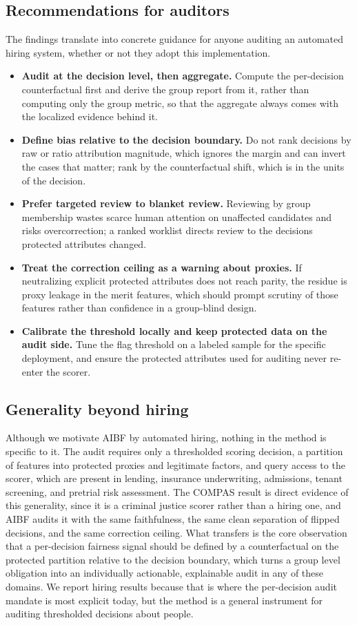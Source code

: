 \documentclass[conference]{IEEEtran}
\begin{document}
\subsection{Recommendations for auditors}
The findings translate into concrete guidance for anyone auditing an automated hiring
system, whether or not they adopt this implementation.

\begin{itemize}
\item \textbf{Audit at the decision level, then aggregate.} Compute the per-decision
counterfactual first and derive the group report from it, rather than computing only the
group metric, so that the aggregate always comes with the localized evidence behind it.
\item \textbf{Define bias relative to the decision boundary.} Do not rank decisions by
raw or ratio attribution magnitude, which ignores the margin and can invert the cases
that matter; rank by the counterfactual shift, which is in the units of the decision.
\item \textbf{Prefer targeted review to blanket review.} Reviewing by group membership
wastes scarce human attention on unaffected candidates and risks overcorrection; a
ranked worklist directs review to the decisions protected attributes changed.
\item \textbf{Treat the correction ceiling as a warning about proxies.} If neutralizing
explicit protected attributes does not reach parity, the residue is proxy leakage in the
merit features, which should prompt scrutiny of those features rather than confidence in
a group-blind design.
\item \textbf{Calibrate the threshold locally and keep protected data on the audit
side.} Tune the flag threshold on a labeled sample for the specific deployment, and
ensure the protected attributes used for auditing never re-enter the scorer.
\end{itemize}

\subsection{Generality beyond hiring}
Although we motivate AIBF by automated hiring, nothing in the method is specific to it.
The audit requires only a thresholded scoring decision, a partition of features into
protected proxies and legitimate factors, and query access to the scorer, which are
present in lending, insurance underwriting, admissions, tenant screening, and pretrial
risk assessment. The COMPAS result is direct evidence of this generality, since it is a
criminal justice scorer rather than a hiring one, and AIBF audits it with the same
faithfulness, the same clean separation of flipped decisions, and the same
correction ceiling. What transfers is the core observation that a per-decision fairness
signal should be defined by a counterfactual on the protected partition relative to the
decision boundary, which turns a group level obligation into an individually
actionable, explainable audit in any of these domains. We report hiring results because
that is where the per-decision audit mandate is most explicit today, but the method is
a general instrument for auditing thresholded decisions about people.
\end{document}
